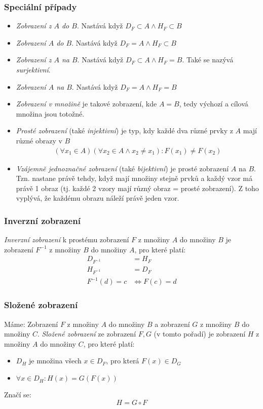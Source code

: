 \documentclass[12pt]{article}
\begin{document}
\subsubsection{Speciální případy}
\begin{itemize}
\item \emph{Zobrazení z $A$ do $B$}. Nastává když $D_F \subset A \land H_F \subset B$
\item \emph{Zobrazení $A$ do $B$}. Nastává když $D_F = A \land H_F \subset B$
\item \emph{Zobrazení z $A$ na $B$}. Nastává když $D_F \subset A \land H_F = B$. Také se nazývá \emph{surjektivní}.
\item \emph{Zobrazení $A$ na $B$}. Nastává když $D_F = A \land H_F = B$
\item \emph{Zobrazení v množině} je takové zobrazení, kde $A =B$, tedy výchozí a cílová množina jsou totožné.
\item \emph{Prosté zobrazení} (také \emph{injektivní}) je typ, kdy každé dva různé prvky z $A$ mají různé obrazy v $B$
\begin{align}
(\forall x_1 \in A)(\forall x_2 \in A \land x_2 \neq x_1): F(x_1) \neq F(x_2)
\end{align}
\item \emph{Vzájemně jednoznačné zobrazení} (také \emph{bijektivní}) je prosté zobrazení $A$ na $B$. Tzn. nastane právě tehdy, když mají množiny stejně prvků a každý vzor má právě 1 obraz (tj. každé 2 vzory mají různý obraz = prosté zobrazení). Z toho vyplývá, že každému obrazu náleží právě jeden vzor.
\end{itemize}
\subsubsection{Inverzní zobrazení}
\emph{Inverzní zobrazení} k prostému zobrazení $F$ z množiny $A$ do množiny $B$ je zobrazení $F^{-1}$ z množiny $B$ do množiny $A$, pro které platí:
\begin{align}
D_{F^{-1}} &= H_F\\
H_{F^{-1}} &= D_F\\
F^{-1}(d) = c &\iff F(c) =d
\end{align}
\subsubsection{Složené zobrazení}
Máme: Zobrazení $F$ z množiny $A$ do množiny $B$ a zobrazení $G$ z množiny $B$ do množiny $C$. \emph{Složené zobrazení} ze zobrazení $F, G$ (v tomto pořadí) je zobrazení $H$ z množiny $A$ do množiny $C$, pro které platí:
\begin{itemize}
\item $D_H$ je množina všech  $x \in D_F$, pro která $F(x) \in D_G$
\item $\forall x \in D_H: H(x) = G(F(x)) $
\end{itemize}
Značí se:
\begin{equation}
H = G \circ F
\end{equation}
\end{document}

